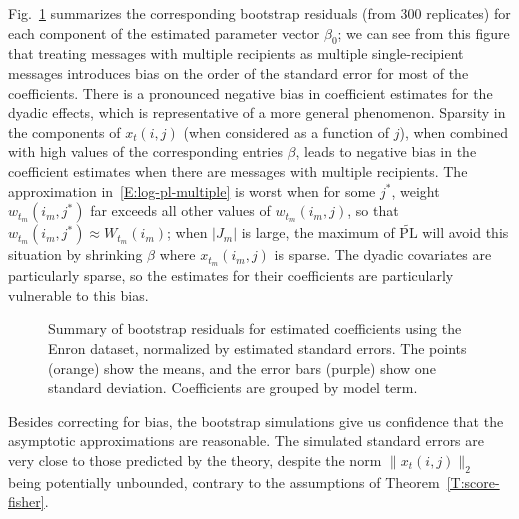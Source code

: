 \documentclass[final]{statsoc}
\begin{document}
Fig.~\ref{F:boot-resid} summarizes the corresponding bootstrap residuals (from
$300$ replicates) for each component of the estimated parameter vector
$\beta_0$; we can see from this figure that treating messages with multiple
recipients as multiple single-recipient messages introduces bias on the order of the
standard error for most of the coefficients.  There is a pronounced negative
bias in coefficient estimates for the dyadic effects, which is representative
of a more general phenomenon.  Sparsity in the components of $x_{t}(i,j)$
(when considered as a function of $j$), when combined with high values of the
corresponding entries $\beta$, leads to negative bias in the coefficient
estimates when there are messages with multiple recipients.  The approximation
in~\eqref{E:log-pl-multiple} is worst when for some $j^\ast$, weight
$w_{t_m}(i_m,j^\ast)$ far exceeds all other values of $w_{t_m}(i_m,j)$, so
that $w_{t_m}(i_m, j^\ast) \approx W_{t_m}(i_m)$; when $|J_m|$ is large, the
maximum of $\widetilde{\mathrm{PL}}$ will avoid this situation by shrinking
$\beta$ where $x_{t_m}(i_m, j)$ is sparse.  The dyadic covariates are
particularly sparse, so the estimates for their coefficients are particularly
vulnerable to this bias.


\begin{figure}
    \centering
    \caption{
        Summary of bootstrap residuals
        for estimated coefficients using the Enron dataset, normalized by
        estimated standard errors.  The points (orange) show the means, and
        the error bars (purple) show one standard deviation.  Coefficients
        are grouped by model term.
    }
    \label{F:boot-resid}
\end{figure}

Besides correcting for bias, the bootstrap simulations give us confidence that
the asymptotic approximations are reasonable.  The simulated standard errors
are very close to those predicted by the theory, despite the norm $\| x_t(i,j)
\|_2$ being potentially unbounded, contrary to the assumptions of
Theorem~\ref{T:score-fisher}.
\end{document}

